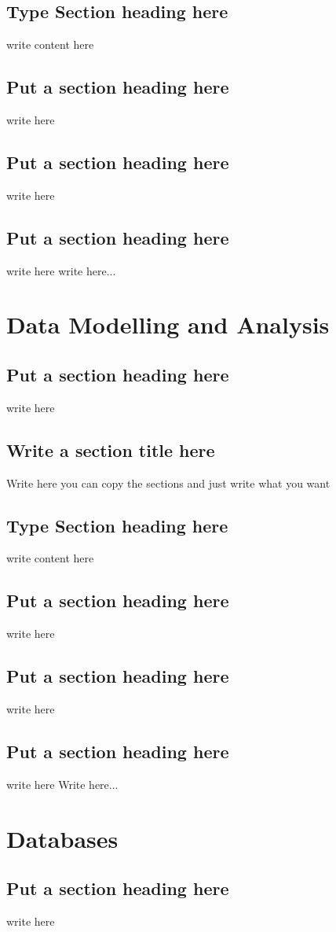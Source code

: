 \documentclass[a4paper,twoside]{scrbook}
\begin{document}
\section{Type Section heading here}
write content here
\section{Put a section heading here}
write here
\section{Put a section heading here}
write here
\section{Put a section heading here}
write here
write here...
\chapter{Data Modelling and Analysis}\label{ch3}
\section{Put a section heading here}
write here
\section{Write a section title here}
Write here you can copy the sections and just write what you want
\section{Type Section heading here}
write content here
\section{Put a section heading here}
write here
\section{Put a section heading here}
write here
\section{Put a section heading here}
write here
Write here...
\chapter{Databases}\label{ch4}
\section{Put a section heading here}
write here
\end{document}
